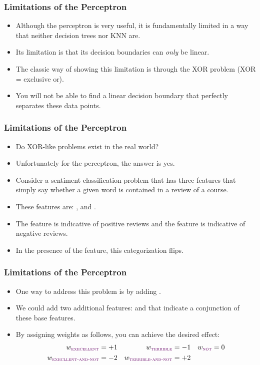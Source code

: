 \documentclass[trans]{beamer}
\begin{document}
\begin{frame}
  \frametitle{Limitations of the Perceptron}
\begin{itemize}
\item 
Although the perceptron is very useful, it is fundamentally limited in
a way that neither decision trees nor KNN are.  
\item Its limitation is that
its decision boundaries can \emph{only} be linear.  
\item The classic way of
showing this limitation is through the XOR problem (XOR = exclusive
or).  
\end{itemize}
\begin{itemize}
\item You will not be able to find a
linear decision boundary that perfectly separates these data points.
\end{itemize}
\end{frame}

\begin{frame}
  \frametitle{Limitations of the Perceptron}
\begin{itemize}
\item 
Do XOR-like problems exist in the real
world? 
\item Unfortunately for the perceptron, the answer is yes.  
\item Consider
a sentiment classification problem that has three features that simply
say whether a given word is contained in a review of a course. 
\item These
features are: ,  and .  
\item The
 feature is indicative of positive reviews and the
 feature is indicative of negative reviews.  
\item In the
presence of the  feature, this categorization flips.
\end{itemize}
\end{frame}

\begin{frame}
  \frametitle{Limitations of the Perceptron}
\begin{itemize}
\item 
One way to address this problem is by adding .
  \item   We could add two additional features:
 and  that indicate
a conjunction of these base features.  
\item By assigning weights as
follows, you can achieve the desired effect:
\begin{align*}
w_{\feat{execellent}} &= +1
& w_{\feat{terrible}} &= -1
& w_{\feat{not}} &= 0 \\
w_{\feat{execllent-and-not}} &= -2 
& w_{\feat{terrible-and-not}} &= +2
\end{align*}
\end{itemize}
\end{frame}
\end{document}
